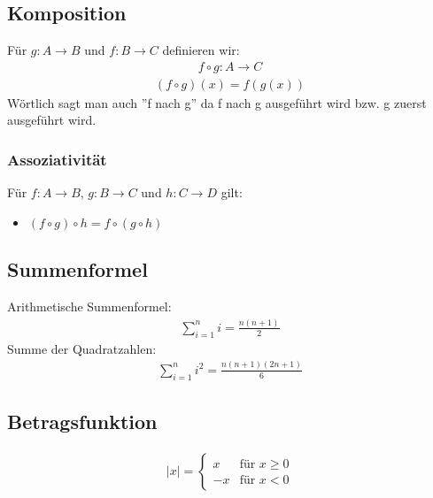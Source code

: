 \subsection{Komposition}
Für $g: A \rightarrow B $ und $f: B \rightarrow C$ definieren wir:
\begin{align*}
    f \circ g: A \rightarrow C
\end{align*}
\begin{align*}
    (f \circ g)(x) = f(g(x))
\end{align*}
Wörtlich sagt man auch ''f nach g'' da f nach g ausgeführt wird bzw. g zuerst ausgeführt wird.
\subsubsection{Assoziativität}
Für $f: A \rightarrow B$, $g: B \rightarrow C$ und $h: C \rightarrow D$ gilt:
\begin{itemize}
    \item $(f \circ g) \circ h = f \circ (g \circ h)$
\end{itemize}
\subsection{Summenformel}
Arithmetische Summenformel:
\begin{align*}
    \sum_{i=1}^{n} i = \frac{n(n+1)}{2}
\end{align*}
Summe der Quadratzahlen:
\begin{align*}
    \sum_{i=1}^{n} i^2 = \frac{n(n+1)(2n+1)}{6}
\end{align*}
\subsection{Betragsfunktion}
\begin{center}
\end{center}
\begin{align*}
    |x| = \begin{cases}
        x & \text{für } x \geq 0\\
        -x & \text{für } x < 0
    \end{cases}
\end{align*}